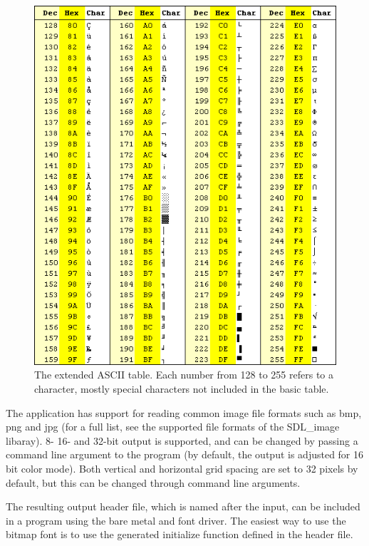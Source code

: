 \documentclass[10pt,a4paper]{article}
\begin{document}
\begin{figure}
\begin{center}
\includegraphics[scale=0.6]{../pictures/ascii2}
\caption{The extended ASCII table. Each number from 128 to 255 refers to a character, mostly special characters not included in the basic table.}
\label{fig:ascii2}
\end{center}
\end{figure}

The application has support for reading common image file formats such as bmp, png and jpg (for a full list, see the supported file formats of the SDL\_image libaray). 8- 16- and 32-bit output is supported, and can be changed by passing a command line argument to the program (by default, the output is adjusted for 16 bit color mode). Both vertical and horizontal grid spacing are set to 32 pixels by default, but this can be changed through command line arguments.

The resulting output header file, which is named after the input, can be included in a program using the bare metal and font driver. The easiest way to use the bitmap font is to use the generated initialize function defined in the header file.
\end{document}
